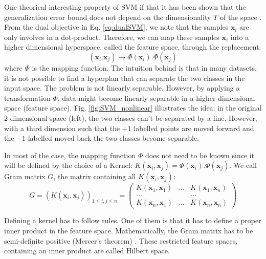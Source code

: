 One theorical interesting property of SVM if that it has been shown that the generalization error bound does not depend on the dimensionality $T$ of the space \cite{Schlkopf2013}. From the dual objective in Eq. \ref{eq:dualSVM}, we note that the samples $\textbf{x}_i$ are only involves in a dot-product. Therefore, we can map these samples $\textbf{x}_i$ into a higher dimensional hyperspace, called the feature space, through the replacement:
\begin{equation}
	(\textbf{x}_i . \textbf{x}_j) \rightarrow \Phi(\textbf{x}_i) . \Phi(\textbf{x}_j) 
\end{equation}
\noindent where $\Phi$ is the mapping function. The intuition behind is that in many datasets, it is not possible to find a hyperplan that can separate the two classes in the input space. The problem is not linearly separable. However, by applying a transformation $\Phi$, data might become linearly separable in a higher dimensional space (feature space). Fig. \ref{fig:SVM_nonlinear} illustrates the idea: in the original 2-dimensional space (left), the two classes can't be separated by a line. However, with a third dimension such that the $+1$ labelled points are moved forward and the $-1$ labelled moved back the two classes become separable.

In most of the case, the mapping function $\Phi$ does not need to be known since it will be defined by the choice of a Kernel: $K(\textbf{x}_i,\textbf{x}_j)= \Phi(\textbf{x}_i) . \Phi(\textbf{x}_j)$. We call Gram matrix $G$, the matrix containing all $K(\textbf{x}_i,\textbf{x}_j)$:
\begin{equation*}
	G = (K(\textbf{x}_i,\textbf{x}_j))_{1 \leq i,j \leq n} = 
	\begin{pmatrix}
	K(\textbf{x}_1,\textbf{x}_1) & ... & K(\textbf{x}_1,\textbf{x}_n) \\
	... & & ... \\
	K(\textbf{x}_n,\textbf{x}_1) & ... & K(\textbf{x}_n,\textbf{x}_n) 
	\end{pmatrix}
\end{equation*}

\noindent Defining a kernel has to follow rules. One of them is that it has to define a proper inner product in the feature space. Mathematically, the Gram matrix has to be semi-definite positive (Mercer's theorem) \cite{Schlkopf2013}. These restricted feature spaces, containing an inner product are called Hilbert space.


